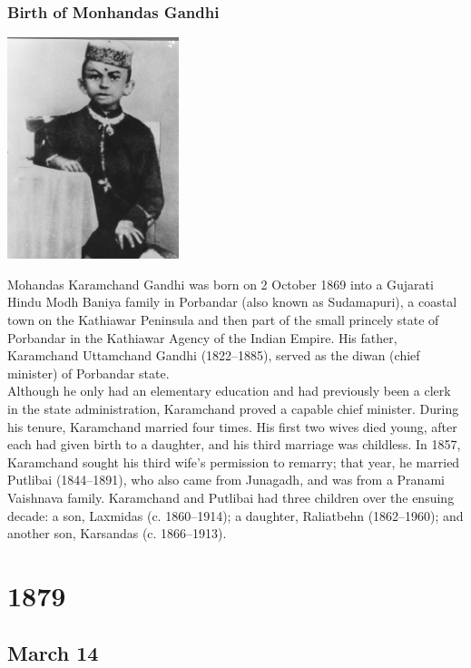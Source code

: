 \documentclass[11pt]{report}
\begin{document}
\subsection{Birth of Monhandas Gandhi}
\vspace{2mm}\begin{center}\includegraphics[width=5cm]{./img/youngGandhi.jpg}\end{center}
Mohandas Karamchand Gandhi was born on 2 October 1869 into a Gujarati Hindu Modh Baniya family in Porbandar (also known as Sudamapuri), a coastal town on the Kathiawar Peninsula and then part of the small princely state of Porbandar in the Kathiawar Agency of the Indian Empire. His father, Karamchand Uttamchand Gandhi (1822–1885), served as the diwan (chief minister) of Porbandar state.\\
Although he only had an elementary education and had previously been a clerk in the state administration, Karamchand proved a capable chief minister. During his tenure, Karamchand married four times. His first two wives died young, after each had given birth to a daughter, and his third marriage was childless. In 1857, Karamchand sought his third wife's permission to remarry; that year, he married Putlibai (1844–1891), who also came from Junagadh, and was from a Pranami Vaishnava family. Karamchand and Putlibai had three children over the ensuing decade: a son, Laxmidas (c. 1860–1914); a daughter, Raliatbehn (1862–1960); and another son, Karsandas (c. 1866–1913).

\chapter{1879}
\section{March 14}
\end{document}
